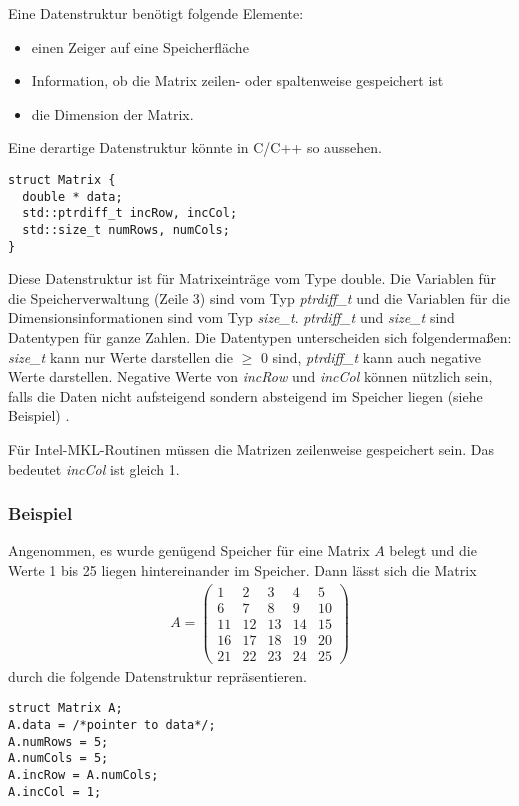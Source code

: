\newpage
Eine Datenstruktur benötigt folgende Elemente:
\begin{itemize}
	\item einen Zeiger auf eine Speicherfläche
	\item Information, ob die Matrix zeilen- oder spaltenweise gespeichert ist 
	\item die Dimension der Matrix.
\end{itemize}


Eine derartige Datenstruktur könnte in C/C++ so aussehen.
\begin{lstlisting}
struct Matrix {
  double * data;
  std::ptrdiff_t incRow, incCol;
  std::size_t numRows, numCols;
}
\end{lstlisting}

Diese Datenstruktur ist für Matrixeinträge vom Type double.
Die Variablen für die Speicherverwaltung (Zeile 3) sind vom Typ \textit{ptrdiff\_t} und die Variablen für die Dimensionsinformationen sind vom Typ \textit{size\_t}.
\textit{ptrdiff\_t} und \textit{size\_t} sind Datentypen für ganze Zahlen.
Die Datentypen unterscheiden sich folgendermaßen: \textit{size\_t} kann nur Werte darstellen die $\geq$ 0 sind, \textit{ptrdiff\_t} kann auch negative Werte darstellen. 
Negative Werte von \textit{incRow} und \textit{incCol} können nützlich sein, falls die Daten nicht aufsteigend sondern absteigend im Speicher liegen (siehe Beispiel) \cite{blast}.

Für Intel-MKL-Routinen müssen die Matrizen zeilenweise gespeichert sein.
Das bedeutet \textit{incCol} ist gleich 1.
\newpage
\subsubsection{Beispiel}
Angenommen, es wurde genügend Speicher für eine Matrix $A$ belegt und die Werte 1 bis 25 liegen hintereinander im Speicher.
Dann lässt sich die Matrix
\begin{align*}
	A = \begin{pmatrix}
	 1 &  2 &  3 &  4 &  5 \\
	 6 &  7 &  8 &  9 & 10 \\
	11 & 12 & 13 & 14 & 15 \\
	16 & 17 & 18 & 19 & 20 \\
	21 & 22 & 23 & 24 & 25 
	\end{pmatrix}
\end{align*}
durch die folgende Datenstruktur repräsentieren.
\begin{lstlisting}
struct Matrix A;
A.data = /*pointer to data*/;
A.numRows = 5; 
A.numCols = 5;
A.incRow = A.numCols;
A.incCol = 1;
\end{lstlisting}

